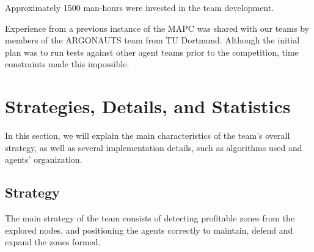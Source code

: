 \documentclass{llncs2e/llncs}
\begin{document}
    Approximately 1500 man-hours were invested in the team development.

    Experience from a previous instance of the MAPC was shared with our teams by
    members of the ARGONAUTS team from TU Dortmund\cite{Holzgen:2011}. Although
    the initial plan was to run tests against other agent teams prior to the
    competition, time constraints made this impossible.



\section{Strategies, Details, and Statistics}

    
    In this section, we will explain the main characteristics of the team's 
    overall strategy, as well as several implementation details, such as 
    algorithms used and agents' organization.

\subsection{Strategy}

    The main strategy of the team consists of detecting profitable zones from the 
    explored nodes, and positioning the agents correctly to maintain, defend 
    and expand the zones formed. 
    
\end{document}
